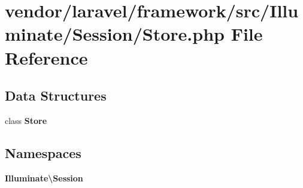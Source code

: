 \section{vendor/laravel/framework/src/\+Illuminate/\+Session/\+Store.php File Reference}
\label{laravel_2framework_2src_2_illuminate_2_session_2_store_8php}
\subsection*{Data Structures}
\begin{DoxyCompactItemize}
\item 
class {\bf Store}
\end{DoxyCompactItemize}
\subsection*{Namespaces}
\begin{DoxyCompactItemize}
\item 
 {\bf Illuminate\textbackslash{}\+Session}
\end{DoxyCompactItemize}
